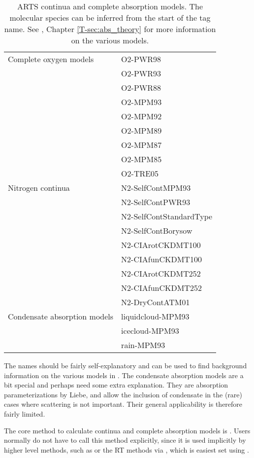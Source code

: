 \begin{table}
\begin{tabular}{ll}
Complete oxygen models & O2-PWR98 \\
& O2-PWR93 \\
& O2-PWR88 \\
& O2-MPM93 \\
& O2-MPM92 \\
& O2-MPM89 \\
& O2-MPM87 \\
& O2-MPM85 \\
& O2-TRE05 \\[1ex]

Nitrogen continua & N2-SelfContMPM93 \\
& N2-SelfContPWR93 \\
& N2-SelfContStandardType \\
& N2-SelfContBorysow \\
& N2-CIArotCKDMT100 \\
& N2-CIAfunCKDMT100 \\
& N2-CIArotCKDMT252 \\
& N2-CIAfunCKDMT252 \\
& N2-DryContATM01 \\[1ex]

Condensate absorption models & liquidcloud-MPM93 \\
& icecloud-MPM93 \\
& rain-MPM93 \\

\hline  
\end{tabular}
\caption{ARTS continua and complete absorption models. The molecular
  species can be inferred from the start of the tag name.  See
  \theory, Chapter \ref{T-sec:abs_theory} for more information on the
  various models.}
\label{tab:absorption:continua}
\end{table}

The names should be fairly self-explanatory and can be used to find
background information on the various models in \theory.  The
condensate absorption models are a bit special and perhaps need some
extra explanation. They are absorption parameterizations by Liebe, and
allow the inclusion of condensate in the (rare) cases where scattering
is not important. Their general applicability is therefore fairly limited.

The core method to calculate continua and complete absorption models
is . Users normally do not have to
call this method explicitly, since it is used implicitly by higher
level methods, such as  or the
RT methods via , which is easiest
set using .

